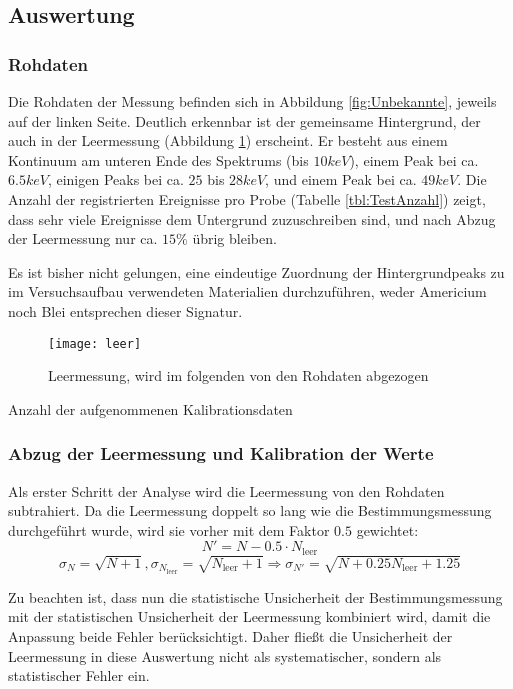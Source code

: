 \documentclass{../Misc/MontavonLaTeX/Montavon}
\newcommand{\fullwidth}{1.0\textwidth}
\begin{document}
\subsection{Auswertung}
\subsubsection{Rohdaten}
Die Rohdaten der Messung befinden sich in Abbildung \ref{fig:Unbekannte}, jeweils auf der linken Seite. Deutlich erkennbar ist der gemeinsame Hintergrund, der auch in der Leermessung (Abbildung \ref{fig:Leermessung}) erscheint. Er besteht aus einem Kontinuum am unteren Ende des Spektrums (bis $10 \unit{keV}$), einem Peak bei ca. $6.5 \unit{keV}$, einigen Peaks bei ca. $25$ bis $28 \unit{keV}$, und einem Peak bei ca. $49 \unit{keV}$. 
Die Anzahl der registrierten Ereignisse pro Probe (Tabelle \ref{tbl:TestAnzahl}) zeigt, dass sehr viele Ereignisse dem Untergrund zuzuschreiben sind, und nach Abzug der Leermessung nur ca. $15 \unit{\%}$ übrig bleiben.

Es ist bisher nicht gelungen, eine eindeutige Zuordnung der Hintergrundpeaks zu im Versuchsaufbau verwendeten Materialien durchzuführen, weder Americium noch Blei entsprechen dieser Signatur\cite{nist}.


\begin{figure}[htbp]
\centering
\texttt{[image: leer]}
\caption{Leermessung, wird im folgenden von den Rohdaten abgezogen}
\label{fig:Leermessung}
\end{figure}

\begin{table}[htbp]
\centering

\caption{Anzahl der aufgenommenen Kalibrationsdaten}
\label{tbl:TestAnzahl}
\end{table}

\subsubsection{Abzug der Leermessung und Kalibration der Werte}
Als erster Schritt der Analyse wird die Leermessung von den Rohdaten subtrahiert. Da die Leermessung doppelt so lang wie die Bestimmungsmessung durchgeführt wurde, wird sie vorher mit dem Faktor $0.5$ gewichtet:
\[ N' = N - 0.5 \cdot N_\textrm{leer} \]
\[ \sigma_N = \sqrt{N+1}, \sigma_{N_\textrm{leer}} = \sqrt{N_\textrm{leer}+1} \Rightarrow \sigma_{N'} = \sqrt{N + 0.25 N_\textrm{leer} + 1.25}  \]

Zu beachten ist, dass nun die statistische Unsicherheit der Bestimmungsmessung mit der statistischen Unsicherheit der Leermessung kombiniert wird, damit die Anpassung beide Fehler berücksichtigt. Daher fließt die Unsicherheit der Leermessung in diese Auswertung nicht als systematischer, sondern als statistischer Fehler ein.
\end{document}
